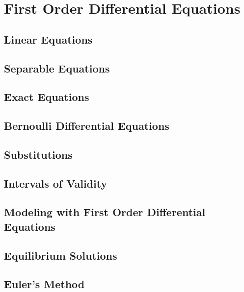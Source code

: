\documentclass[../satmath.tex]{subfiles}
\begin{document}
\chapter{First Order Differential Equations}
\section{Linear Equations}
\section{Separable Equations}
\section{Exact Equations}
\section{Bernoulli Differential Equations}
\section{Substitutions}
\section{Intervals of Validity}
\section{Modeling with First Order Differential Equations}
\section{Equilibrium Solutions}
\section{Euler's Method}
\end{document}
